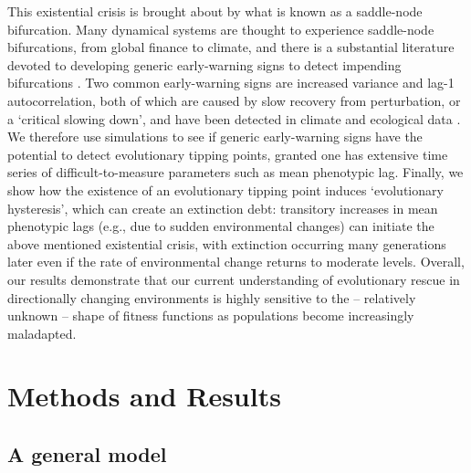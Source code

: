 \documentclass[12pt,letterpaper]{article} %
\begin{document}
This existential crisis is brought about by what is known as a saddle-node bifurcation.
Many dynamical systems are thought to experience saddle-node bifurcations, from global finance to climate, and there is a substantial literature devoted to developing generic early-warning signs to detect impending bifurcations \citep[reviewed in][]{Scheffer2009}.
Two common early-warning signs are increased variance and lag-1 autocorrelation, both of which are caused by slow recovery from perturbation, or a `critical slowing down', and have been detected in climate and ecological data \citep{Scheffer2009,Lenton2011}.
We therefore use simulations to see if generic early-warning signs have the potential to detect evolutionary tipping points, granted one has extensive time series of difficult-to-measure parameters such as mean phenotypic lag.
Finally, we show how the existence of an evolutionary tipping point induces `evolutionary hysteresis', which can create an extinction debt: transitory increases in mean phenotypic lags (e.g., due to sudden environmental changes) can initiate the above mentioned existential crisis, with extinction occurring many generations later even if the rate of environmental change returns to moderate levels.
Overall, our results demonstrate that our current understanding of evolutionary rescue in directionally changing environments is highly sensitive to the -- relatively unknown -- shape of fitness functions as populations become increasingly maladapted.

\section*{Methods and Results}
\subsection*{A general model}
\end{document}
